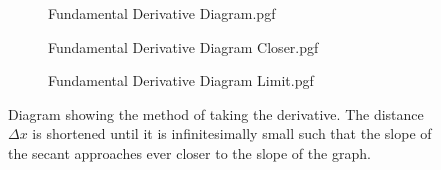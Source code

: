 \documentclass[main.tex]{subfiles}
\begin{document}
            \begin{figure}[!h]
                \centering
                \hspace{-10mm}
                \begin{subfigure}[h]{0.45\textwidth}
                    \centering
                    \scalebox{0.6}
                    {
                        \begin{adjustbox}{clip,trim=5mm 10mm 10mm 10mm}
                            {{Fundamental Derivative Diagram.pgf}}
                        \end{adjustbox}
                    }
                \end{subfigure}
                \hspace{10mm}
                \begin{subfigure}[h]{0.45\textwidth}
                    \centering
                    \scalebox{0.6}
                    {
                        \begin{adjustbox}{clip,trim=5mm 10mm 10mm 10mm}
                            {{Fundamental Derivative Diagram Closer.pgf}}
                        \end{adjustbox}
                    }
                \end{subfigure}

                \vspace*{1em}

                \begin{subfigure}[h]{0.45\textwidth}
                    \centering
                    \scalebox{0.6}
                    {
                        \begin{adjustbox}{clip,trim=5mm 10mm 10mm 10mm}
                            {{Fundamental Derivative Diagram Limit.pgf}}
                        \end{adjustbox}
                    }
                \end{subfigure}
                \caption{Diagram showing the method of taking the derivative. The distance $\Delta x$ is shortened until it is infinitesimally small such that the slope of the secant approaches ever closer to the slope of the graph.}
                \label{fig: Fundamental Derivative Diagram}
            \end{figure}
            \FloatBarrier
            
\end{document}
